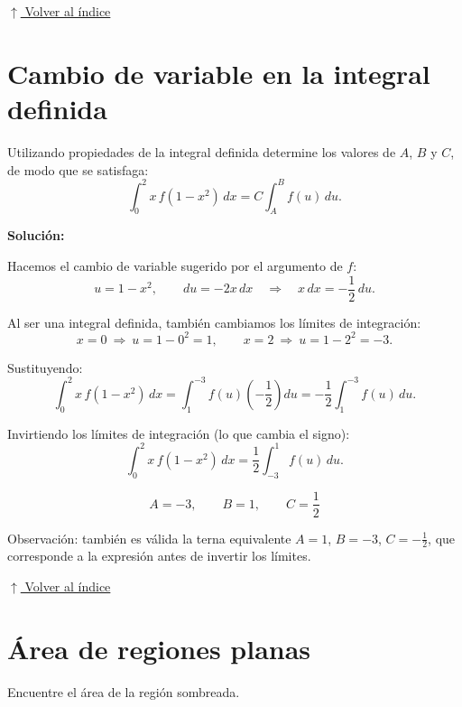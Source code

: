 \documentclass[12pt]{article}
\newcommand{\solucion}{%
    \vspace{0.8em}%
    \textbf{Solución:}%
}
\newcommand{\volverindice}{%
    \vspace{1em}%
    \begin{flushright}%
        \hyperlink{indice}{\small $\uparrow$ Volver al índice}%
    \end{flushright}%
}
\begin{document}
\volverindice
\newpage


\section{Cambio de variable en la integral definida}

Utilizando propiedades de la integral definida determine los valores de
$A$, $B$ y $C$, de modo que se satisfaga:
\[
\int_{0}^{2}x\,f(1-x^2)\,dx=C\int_{A}^{B}f(u)\,du.
\]

\solucion

Hacemos el cambio de variable sugerido por el argumento de $f$:
\[
u=1-x^2,
\qquad
du=-2x\,dx
\quad\Rightarrow\quad
x\,dx=-\frac12\,du.
\]

Al ser una integral definida, también cambiamos los límites de
integración:
\[
x=0\ \Rightarrow\ u=1-0^2=1,
\qquad
x=2\ \Rightarrow\ u=1-2^2=-3.
\]

Sustituyendo:
\[
\int_{0}^{2}x\,f(1-x^2)\,dx
=\int_{1}^{-3}f(u)\left(-\frac12\right)du
=-\frac12\int_{1}^{-3}f(u)\,du.
\]

Invirtiendo los límites de integración (lo que cambia el signo):
\[
\int_{0}^{2}x\,f(1-x^2)\,dx=\frac12\int_{-3}^{1}f(u)\,du.
\]

\[
\boxed{
A=-3,\qquad B=1,\qquad C=\frac12
}
\]

Observación: también es válida la terna equivalente $A=1$, $B=-3$,
$C=-\frac12$, que corresponde a la expresión antes de invertir los
límites.

\volverindice
\newpage


\section{Área de regiones planas}

Encuentre el área de la región sombreada.
\end{document}
